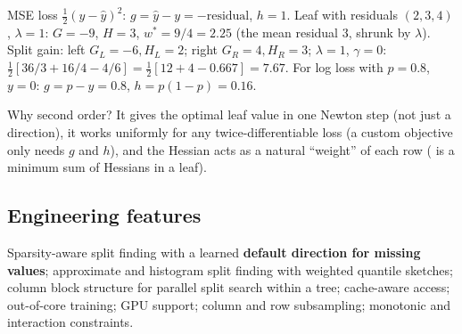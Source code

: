 \begin{example}
MSE loss $\frac12(y - \hat y)^2$: $g = \hat y - y = -\text{residual}$, $h = 1$. Leaf with residuals $(2, 3, 4)$, $\lambda = 1$:
$G = -9$, $H = 3$, $w^* = 9/4 = 2.25$ (the mean residual 3, shrunk by $\lambda$).
Split gain: left $G_L = -6, H_L = 2$; right $G_R = 4, H_R = 3$; $\lambda = 1$, $\gamma = 0$:
$\frac12[36/3 + 16/4 - 4/6] = \frac12[12 + 4 - 0.667] = 7.67$.
For log loss with $p = 0.8$, $y = 0$: $g = p - y = 0.8$, $h = p(1-p) = 0.16$.
\end{example}

Why second order? It gives the optimal leaf value in one Newton step (not just a direction), it works uniformly for any
twice-differentiable loss (a custom objective only needs $g$ and $h$), and the Hessian acts as a natural ``weight'' of each row
( is a minimum sum of Hessians in a leaf).

\subsection{Engineering features}
Sparsity-aware split finding with a learned \textbf{default direction for missing values}; approximate and histogram split
finding with weighted quantile sketches; column block structure for parallel split search within a tree; cache-aware access;
out-of-core training; GPU support; column and row subsampling; monotonic and interaction constraints.

